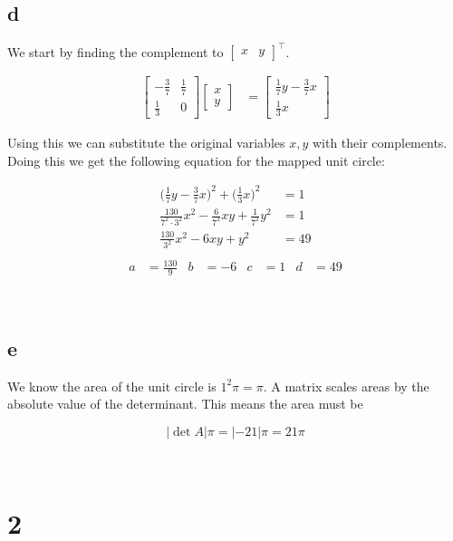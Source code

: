 \documentclass{article}
\newcommand{\blankpage}{
    \newpage
    \
    \newpage
}
\begin{document}
\blankpage
\subsection{d}

We start by finding the complement to $\begin{bmatrix} x & y\end{bmatrix}^\top$.

\begin{align*}
    \begin{bmatrix} -\frac37 & \frac17 \\ \frac13 & 0 \end{bmatrix}\begin{bmatrix} x \\ y\end{bmatrix} &= 
    \begin{bmatrix}
        \frac 17 y - \frac 37 x \\
        \frac 13 x
    \end{bmatrix}
\end{align*}

Using this we can substitute the original variables $x,y$ with their complements. Doing this we get the following equation for the mapped unit circle:

\begin{align*}
    \Big( \frac 17 y - \frac 37 x \Big)^2 + \Big( \frac 13 x \Big)^2 &= 1 \\
    \frac {130}{7^2 \cdot 3^2} x^2 - \frac 6{7^2} xy + \frac 1{7^2} y^2 &= 1 \\
    \frac {130}{3^2} x^2 - 6 xy + y^2 &= 49 \\
\end{align*}
\begin{align*}
    a &= \frac {130}{9} &
    b &= -6 &
    c &= 1 &
    d &= 49
\end{align*}

\blankpage
\subsection{e}

We know the area of the unit circle is $1^2\pi = \pi$. A matrix scales areas by the absolute value of the determinant. This means the area must be

$$|\det A| \pi = |-21|\pi = 21\pi$$

\blankpage
\section{2}
\end{document}

